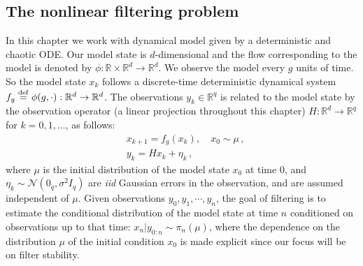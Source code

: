 \subsection{The nonlinear filtering problem}
In this chapter we work with dynamical model given by a deterministic and chaotic ODE. Our model state is $d$-dimensional and the flow corresponding to the model is denoted by $\phi:\mathbb R \times \mathbb R^d\to\mathbb R^d$. We observe the model every $g$ units of time. So the model state $x_k$ follows a discrete-time deterministic dynamical system $f_g \stackrel{\rm def}{=} \phi(g, \cdot): \mathbb{R}^d \to \mathbb{R}^d$. The observations $y_k \in \mathbb{R}^q$ is related to the model state by the observation operator (a linear projection throughout this chapter) $H: \mathbb{R}^d \to \mathbb{R}^q$ for $k = 0, 1, \dots$, as follows:
\begin{align}
&x_{k+1} = f_g(x_k), \quad x_0 \sim \mu \,, \label{eq-state--probing-nfs}\\
&y_{k} = Hx_k + \eta_k \,, \quad  \label{eq-obs--probing-nfs}
\end{align}
where $\mu$ is the initial distribution of the model state $x_0$ at time 0,  and $\eta_k \sim \mathcal{N}(0_q, \sigma^2I_q)$ are \emph{iid} Gaussian errors in the observation, and are assumed independent of $\mu$. Given observations $y_0, y_1, \cdots, y_n$, the goal of filtering is to estimate the conditional distribution of the model state at time $n$ conditioned on observations up to that time: $x_n|y_{0:n} \sim \pi_{n}(\mu)$, where the dependence on the distribution $\mu$ of the initial condition $x_0$ is made explicit since our focus will be on filter stability. %

